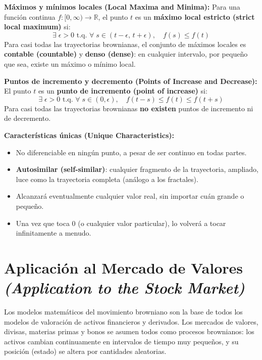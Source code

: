 \documentclass[12pt]{article}
\begin{document}
\textbf{M\'aximos y m\'inimos locales (Local Maxima and Minima):} Para una funci\'on continua $f:[0,\infty)\to\mathbb{R}$, el punto $t$ es un \textbf{m\'aximo local estricto (strict local maximum)} si:
\[
  \exists\;\epsilon > 0 \text{ t.q. } \forall\; s \in (t-\epsilon,\,t+\epsilon),\quad f(s) \leq f(t)
\]
Para casi todas las trayectorias brownianas, el conjunto de m\'aximos locales es \textbf{contable (countable)} y \textbf{denso (dense)}: en cualquier intervalo, por peque\~no que sea, existe un m\'aximo o m\'inimo local.

\textbf{Puntos de incremento y decremento (Points of Increase and Decrease):} El punto $t$ es un \textbf{punto de incremento (point of increase)} si:
\[
  \exists\;\epsilon > 0 \text{ t.q. } \forall\; s \in (0,\epsilon),\quad f(t-s) \leq f(t) \leq f(t+s)
\]
Para casi todas las trayectorias brownianas \textbf{no existen} puntos de incremento ni de decremento.

\textbf{Caracter\'isticas \'unicas (Unique Characteristics):}
\begin{itemize}
  \item No diferenciable en ning\'un punto, a pesar de ser continuo en todas partes.
  \item \textbf{Autosimilar (self-similar)}: cualquier fragmento de la trayectoria, ampliado, luce como la trayectoria completa (an\'alogo a los fractales).
  \item Alcanzar\'a eventualmente cualquier valor real, sin importar cu\'an grande o peque\~no.
  \item Una vez que toca 0 (o cualquier valor particular), lo volver\'a a tocar infinitamente a menudo.
\end{itemize}

\section{Aplicaci\'on al Mercado de Valores
\textit{(Application to the Stock Market)}}

Los modelos matem\'aticos del movimiento browniano son la base de todos los modelos de valoraci\'on de activos financieros y derivados. Los mercados de valores, divisas, materias primas y bonos se asumen todos como procesos brownianos: los activos cambian continuamente en intervalos de tiempo muy peque\~nos, y su posici\'on (estado) se altera por cantidades aleatorias.
\end{document}
